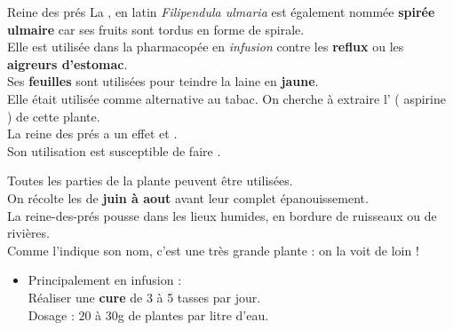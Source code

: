 \label{reinepres}
\ficheidentiteplante
{Reine des prés}
{%
    La , en latin \textit{Filipendula ulmaria} est également nommée
    \textbf{spirée ulmaire} car ses fruits sont tordus en forme de spirale.\\


    Elle est utilisée dans la pharmacopée en \textit{infusion} contre les \textbf{reflux} ou les \textbf{aigreurs d'estomac}.\\

    Ses \textbf{feuilles} sont utilisées pour teindre la laine en \textbf{jaune}.\\

    Elle était utilisée comme alternative au tabac.
}
{%
    On cherche à extraire l' ( aspirine ) de cette plante. \\

    La reine des prés a un effet  et .\\

    Son utilisation est susceptible de faire .
}
{%

    Toutes les parties de la plante peuvent être utilisées.\\
    On récolte les  de \textbf{juin à aout} avant leur complet épanouissement. \\

    La reine-des-prés pousse dans les lieux humides, en bordure de ruisseaux ou de rivières.\\
    Comme l'indique son nom, c'est une très grande plante : on la voit de loin !
}
{%
    \begin{itemize}[label = \bcplume]
        \item Principalement en infusion :\\
                Réaliser une \textbf{cure} de 3 à 5 tasses par jour. \\
                Dosage : $20$ à $30$g de plantes par litre d'eau.
    \end{itemize}
}
